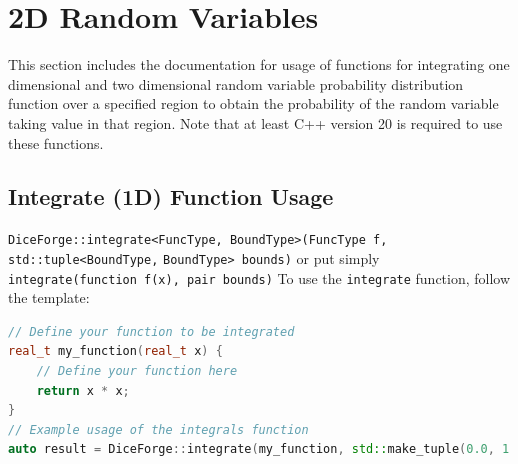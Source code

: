 \documentclass[titlepage, 11pt]{article}
\newcommand{\code}[1]
{\colorbox{light-gray}{\texttt{#1}}}
\begin{document}
\newpage
\section{2D Random Variables}
This section includes the documentation for usage of functions for integrating one dimensional and two dimensional random variable probability distribution function over a specified region to obtain the probability of the random variable taking value in that region. Note that at least C++ version 20 is required to use these functions.
\subsection{Integrate (1D) Function Usage}
\code{DiceForge::integrate<FuncType, BoundType>(FuncType f, std::tuple<BoundType,}
\newline
\code{BoundType> bounds)}
\newline
\newline
or put simply \code{integrate(function f(x), pair bounds)}
\newline
\newline
To use the \code{integrate} function, follow the template:
\begin{lstlisting}[language=C++]
// Define your function to be integrated
real_t my_function(real_t x) {
    // Define your function here
    return x * x;
}
// Example usage of the integrals function
auto result = DiceForge::integrate(my_function, std::make_tuple(0.0, 1.0));
\end{lstlisting}
\end{document}
